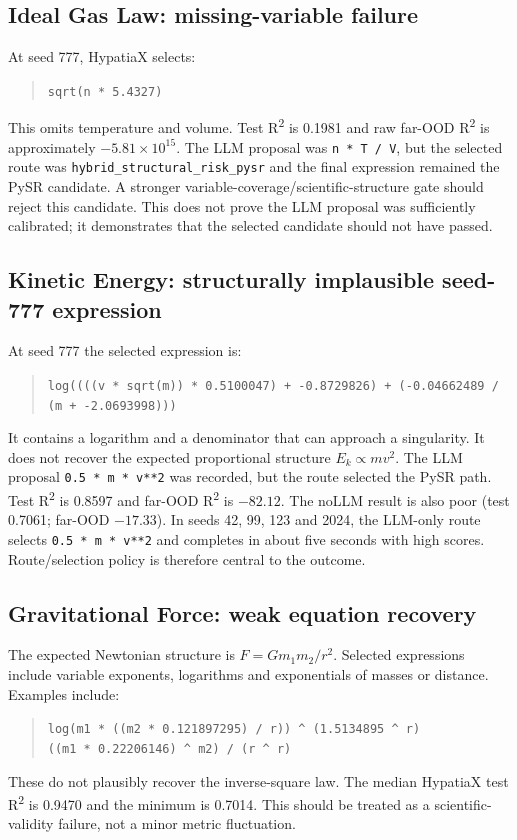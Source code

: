 \documentclass[11pt,a4paper]{article}
\begin{document}
\subsection{Ideal Gas Law: missing-variable failure}
At seed 777, HypatiaX selects:
\begin{quote}\small \texttt{sqrt(n * 5.4327)} \end{quote}
This omits temperature and volume. Test R\textsuperscript{2} is 0.1981 and raw far-OOD R\textsuperscript{2} is approximately $-5.81\times10^{15}$. The LLM proposal was \texttt{n * T / V}, but the selected route was \texttt{hybrid\_structural\_risk\_pysr} and the final expression remained the PySR candidate. A stronger variable-coverage/scientific-structure gate should reject this candidate. This does not prove the LLM proposal was sufficiently calibrated; it demonstrates that the selected candidate should not have passed.

\subsection{Kinetic Energy: structurally implausible seed-777 expression}
At seed 777 the selected expression is:
\begin{quote}\small
\texttt{log((((v * sqrt(m)) * 0.5100047) + -0.8729826) + (-0.04662489 / (m + -2.0693998)))}
\end{quote}
It contains a logarithm and a denominator that can approach a singularity. It does not recover the expected proportional structure $E_k\propto mv^2$. The LLM proposal \texttt{0.5 * m * v**2} was recorded, but the route selected the PySR path. Test R\textsuperscript{2} is 0.8597 and far-OOD R\textsuperscript{2} is $-82.12$. The noLLM result is also poor (test 0.7061; far-OOD $-17.33$). In seeds 42, 99, 123 and 2024, the LLM-only route selects \texttt{0.5 * m * v**2} and completes in about five seconds with high scores. Route/selection policy is therefore central to the outcome.

\subsection{Gravitational Force: weak equation recovery}
The expected Newtonian structure is $F=Gm_1m_2/r^2$. Selected expressions include variable exponents, logarithms and exponentials of masses or distance. Examples include:
\begin{quote}\small
\texttt{log(m1 * ((m2 * 0.121897295) / r)) \textasciicircum{} (1.5134895 \textasciicircum{} r)}\\
\texttt{((m1 * 0.22206146) \textasciicircum{} m2) / (r \textasciicircum{} r)}
\end{quote}
These do not plausibly recover the inverse-square law. The median HypatiaX test R\textsuperscript{2} is 0.9470 and the minimum is 0.7014. This should be treated as a scientific-validity failure, not a minor metric fluctuation.
\end{document}
